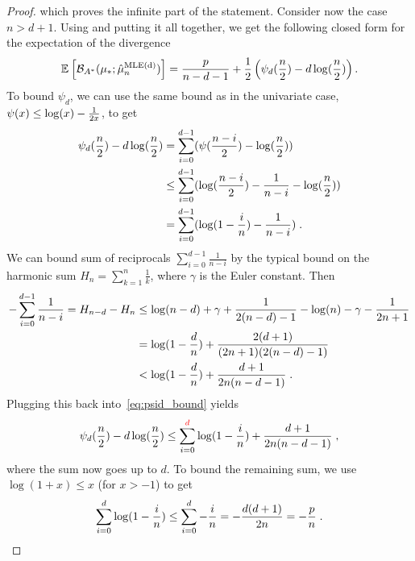 \begin{subappendices}
\begin{proof}
which proves the infinite part of the statement.
Consider now the case $n>d+1$. Using
and putting it all together, we get the following closed form for the expectation of the divergence
 \begin{align}
 	\label{eq:where-we-put-it-back-together-multivariate-gaussian}
 	\expect{\bregmanconj( \mu_*; \hat \mu_n^\text{MLE(d)})}
 	= \frac{p}{n-d-1} + \half \left ( \psi_d\paren{\half[n]} - d \log\paren{\half[n]}  \right ).
 \end{align}
To bound $\psi_d$, we can use the same bound as in the univariate case, $\psi(x) \leq \log(x) - \inv{2x}$, to get
\begin{align}
	\psi_d\paren{\half[n]} - d \log\paren{\half[n]}
	&= \sum_{i=0}^{d-1} \paren{\psi \paren{\half[n - i]} - \log\paren{\half[n]} } \\
	&\leq \sum_{i=0}^{d-1} \paren{\log\paren{\half[n-i]} - \inv{n-i} - \log\paren{\half[n]} } \\
	&= \sum_{i=0}^{d-1} \paren{\log\paren{1 - \frac{i}{n}} - \frac{1}{n-i}} \; .
	\label{eq:psid_bound}
\end{align}
We can bound sum of reciprocals $\sum_{i=0}^{d-1} \frac{1}{n-i}$ by the typical bound on 
the harmonic sum $H_n = \sum_{k=1}^n \frac{1}{k}$,
where $\gamma$ is the Euler constant. Then
\begin{align}
	- \sum_{i=0}^{d-1} \frac{1}{n-i} 
	= H_{n-d} - H_n
	&\leq \log(n-d) + \gamma + \inv{2(n-d) - 1} - \log(n) - \gamma - \inv{2n+1} \\
	&= \log\paren{1 - \frac{d}{n}}  + \frac{2(d + 1)}{(2n+1)(2(n - d) - 1)} \\
	&< \log\paren{1 - \frac{d}{n}}  + \frac{d + 1}{2n(n - d - 1)} \; .
\end{align}
Plugging this back into~\eqref{eq:psid_bound} yields
\begin{align}
	\psi_d(\half[n]) - d \log(\half[n]) 
	\leq \sum_{i=0}^{\textcolor{red}{d}} \log\paren{1 - \frac{i}{n}}
	+  \frac{d + 1}{2n(n - d - 1)} \; ,
\end{align}
where the sum now goes up to $d$.
To bound the remaining sum, we use $\log(1+x)\leq x$ (for $x > -1$) to get
\begin{align}
	\sum_{i=0}^{d} \log\paren{1 - \frac{i}{n}}
	\leq \sum_{i=0}^{d} - \frac{i}{n}
	 = -\frac{d(d+1)}{2n} = -\frac{p}{n} \; .
\end{align}

\end{proof}
\end{subappendices}
